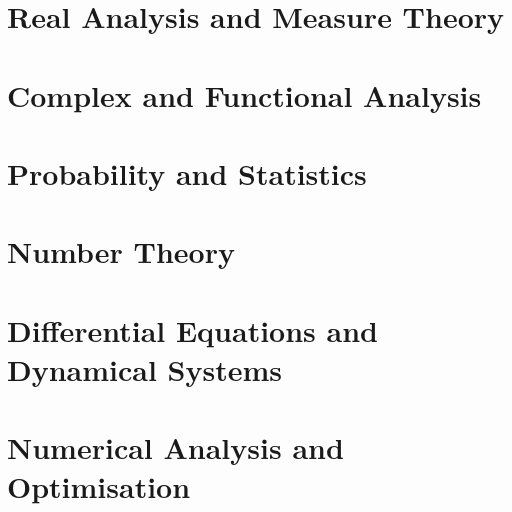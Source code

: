 \documentclass[11pt,openany]{book}
\begin{document}
\part{Real Analysis and Measure Theory}\label{part-measure-theory}







\part{Complex and Functional Analysis}\label{part-analysis}








\part{Probability and Statistics}\label{part-probability}





\part{Number Theory}\label{part-number-theory}












\part{Differential Equations and Dynamical Systems}\label{part-differential-equations}





\part{Numerical Analysis and Optimisation}\label{part-numerical-analysis}

\end{document}
